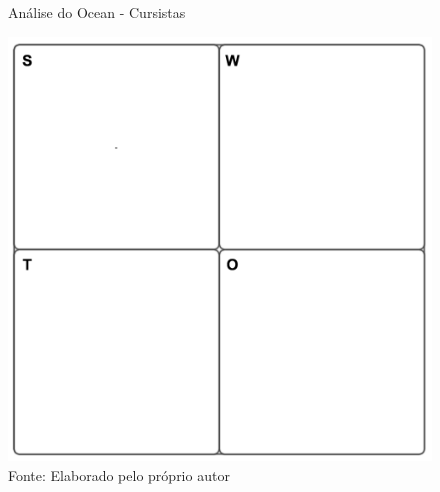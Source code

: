 \begin{figure}[h]
\caption{Análise do Ocean - Cursistas}
\centerline{\includegraphics[scale=0.75]{img/generalswot}}
\label{fig:swotcursistas}
\caption* {Fonte: Elaborado pelo próprio autor}
\end{figure}